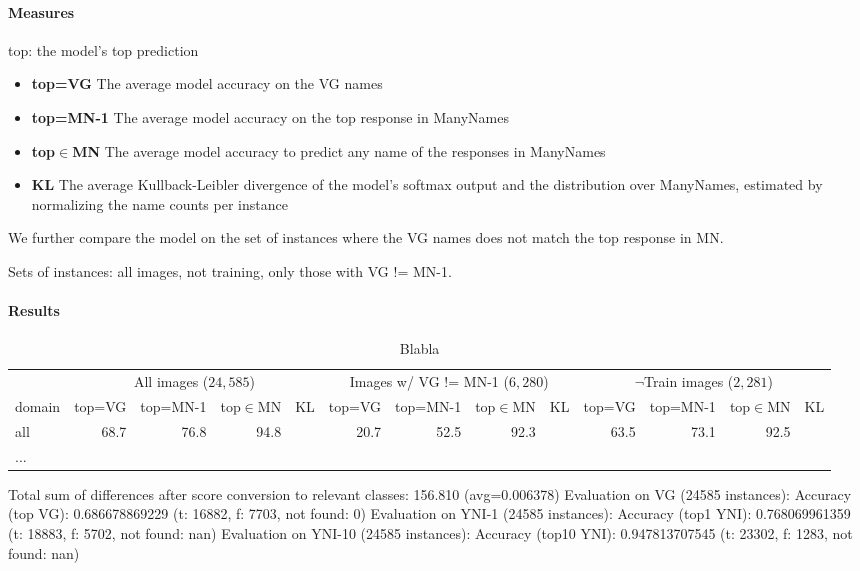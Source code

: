 \paragraph{Measures}
top: the model's top prediction
\begin{itemize}
	\item \textbf{top=VG} The average model accuracy on the VG names
	\item \textbf{top=MN-1} The average model accuracy on the top response in ManyNames
	\item \textbf{top$\in$MN} The average model accuracy to predict any name of the responses in ManyNames
	\item \textbf{KL} The average Kullback-Leibler divergence of the model's softmax output and the  distribution over ManyNames, estimated by normalizing the name counts per instance
\end{itemize}

We further compare the model on the set of instances where the VG names does not match the top response in MN.

Sets of instances: all images, not training, only those with VG != MN-1.

\paragraph{Results} 
\begin{table*}
	\small
	\begin{tabular}{l@{~}|rrrr|rrrr|rrrr}
				 &	\multicolumn{4}{c|}{All images ($24,585$)} 
				 & \multicolumn{4}{c|}{Images w/ VG != MN-1 ($6,280$)}
				 & \multicolumn{4}{c}{$\neg$Train images ($2,281$)} \\
		domain	 &  top=VG & top=MN-1 & top$\in$MN  &  KL
					&  top=VG & top=MN-1 & top$\in$MN  & KL
					&  top=VG & top=MN-1 & top$\in$MN  & KL\\
		\toprule
		all 	& 68.7 & 76.8 & 94.8 & 
				& 20.7 & 52.5 & 92.3 & 
				& 63.5	& 73.1	& 92.5 &\\
		\midrule
		... \\
		\bottomrule
	\end{tabular}
	\caption{Blabla	\label{tab:model}}
\end{table*}
\iffalse
Total sum of differences after score conversion to relevant classes: 156.810 (avg=0.006378)
Evaluation on VG (24585 instances):
Accuracy (top VG): 0.686678869229 (t: 16882, f: 7703, not found: 0)
Evaluation on YNI-1 (24585 instances):
Accuracy (top1 YNI): 0.768069961359 (t: 18883, f: 5702, not found: nan)
Evaluation on YNI-10 (24585 instances):
Accuracy (top10 YNI): 0.947813707545 (t: 23302, f: 1283, not found: nan)

